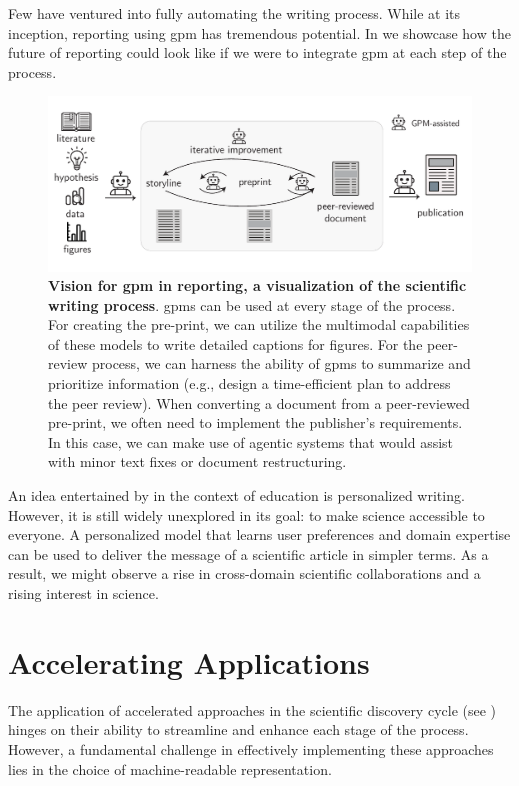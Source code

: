 Few have ventured into fully automating the writing process.\autocite{yamada2025ai} 
While at its inception, reporting using \gls{gpm} has tremendous potential. 
In  we showcase how the future of reporting could look like if we were to integrate \gls{gpm} at each step of the process.

\begin{figure}[!ht]
    \centering
        \includegraphics[width=1\textwidth]{figures/rescaled_figures/chemrev_figure18.pdf}
    \caption{\textbf{Vision for \gls{gpm} in reporting, a visualization of the scientific writing process}. \glspl{gpm} can be used at every stage of the process. For creating the pre-print, we can utilize the multimodal capabilities of these models to write detailed captions for figures. For the peer-review process, we can harness the ability of \glspl{gpm} to summarize and prioritize information (e.g., design a time-efficient plan to address the peer review). When converting a document from a peer-reviewed pre-print, we often need to implement the publisher's requirements. In this case, we can make use of agentic systems that would assist with minor text fixes or document restructuring.}
    \label{fig:writing_with_ml}
\end{figure}

An idea entertained by \textcite{li2023teach} in the context of education is personalized writing. 
However, it is still widely unexplored in its goal: to make science accessible to everyone. 
A personalized model that learns user preferences and domain expertise can be used to deliver the message of a scientific article in simpler terms. 
As a result, we might observe a rise in cross-domain scientific collaborations and a rising interest in science. 

\section{Accelerating Applications}
The application of accelerated approaches in the scientific discovery cycle (see ) hinges on their ability to streamline and enhance each stage of the process.
However, a fundamental challenge in effectively implementing these approaches lies in the choice of machine-readable representation.

